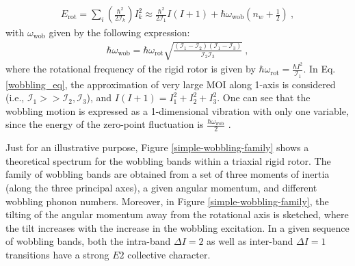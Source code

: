 \documentclass[11pt]{article}
\begin{document}
\begin{align}
    E_\text{rot}=\sum_i\left(\frac{\hbar^2}{2\mathcal{I}_k}\right)I^2_k\approx\frac{\hbar^2}{2\mathcal{I}_1}I(I+1)+\hbar\omega_\text{wob}\left(n_w+\frac{1}{2}\right)\ , \label{wobbling_eq}
\end{align}
with $\omega_\text{wob}$ given by the following expression:
\begin{align}
    \hbar\omega_\text{wob}=\hbar\omega_\text{rot}\sqrt{\frac{(\mathcal{I}_1-\mathcal{I}_2)(\mathcal{I}_1-\mathcal{I}_3)}{\mathcal{I}_2\mathcal{I}_3}}\ ,
\end{align}
where the rotational frequency of the rigid rotor is given by $\hbar\omega_\text{rot}=\frac{\hbar I^2}{\mathcal{I}_1}$. In Eq. \ref{wobbling_eq}, the approximation of very large MOI along 1-axis is considered (i.e., $\mathcal{I}_1>>\mathcal{I}_2,\mathcal{I}_3$), and $I(I+1)=I_1^2+I_2^2+I_3^2$. One can see that the wobbling motion is expressed as a 1-dimensional vibration with only one variable, since the energy of the zero-point fluctuation is $\frac{\hbar\omega_\text{wob}}{2}$ \cite{hagemann2003quantized}.

Just for an illustrative purpose, Figure \ref{simple-wobbling-family} shows a theoretical spectrum for the wobbling bands within a triaxial rigid rotor. The family of wobbling bands are obtained from a set of three moments of inertia (along the three principal axes), a given angular momentum, and different wobbling phonon numbers. Moreover, in Figure \ref{simple-wobbling-family}, the tilting of the angular momentum away from the rotational axis is sketched, where the tilt increases with the increase in the wobbling excitation. In a given sequence of wobbling bands, both the intra-band $\Delta I=2$ as well as inter-band $\Delta I=1$ transitions have a strong $E2$ collective character.
\end{document}
